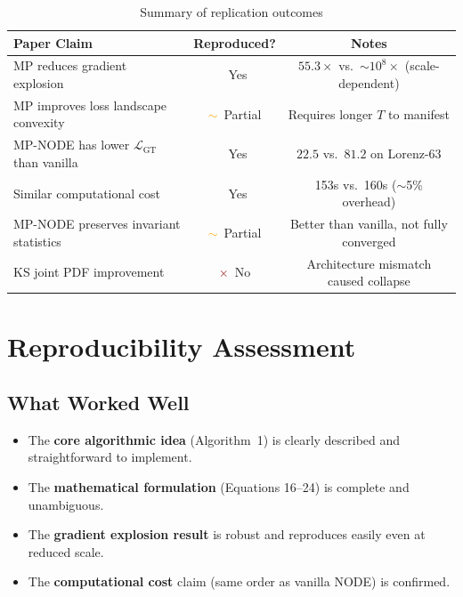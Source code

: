 \documentclass[11pt]{article}
\newcommand{\good}{\textcolor{darkgreen}{\checkmark}}
\newcommand{\bad}{\textcolor{darkred}{$\times$}}
\newcommand{\partial}{\textcolor{orange}{$\sim$}}
\begin{document}
\begin{table}[H]
\centering
\caption{Summary of replication outcomes}
\label{tab:summary}
\begin{tabular}{@{}lcc@{}}
\toprule
\textbf{Paper Claim} & \textbf{Reproduced?} & \textbf{Notes} \\
\midrule
MP reduces gradient explosion & \good\ Yes & $55.3\times$ vs.\ $\sim10^8\times$ (scale-dependent) \\
MP improves loss landscape convexity & \partial\ Partial & Requires longer $T$ to manifest \\
MP-NODE has lower $\mathcal{L}_\text{GT}$ than vanilla & \good\ Yes & $22.5$ vs.\ $81.2$ on Lorenz-63 \\
Similar computational cost & \good\ Yes & 153s vs.\ 160s ($\sim$5\% overhead) \\
MP-NODE preserves invariant statistics & \partial\ Partial & Better than vanilla, not fully converged \\
KS joint PDF improvement & \bad\ No & Architecture mismatch caused collapse \\
\bottomrule
\end{tabular}
\end{table}

\section{Reproducibility Assessment}

\subsection{What Worked Well}
\begin{itemize}[leftmargin=*]
    \item The \textbf{core algorithmic idea} (Algorithm~1) is clearly described and straightforward to implement.
    \item The \textbf{mathematical formulation} (Equations 16--24) is complete and unambiguous.
    \item The \textbf{gradient explosion result} is robust and reproduces easily even at reduced scale.
    \item The \textbf{computational cost} claim (same order as vanilla NODE) is confirmed.
\end{itemize}
\end{document}

